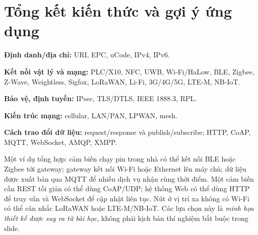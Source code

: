 \section{Tổng kết kiến thức và gợi ý ứng dụng}
\begin{ghinho}[title={Những khái niệm cần phân biệt}]
\textbf{Định danh/địa chỉ:} URI, EPC, uCode, IPv4, IPv6.\par
\textbf{Kết nối vật lý và mạng:} PLC/X10, NFC, UWB, Wi-Fi/HaLow, BLE, Zigbee, Z-Wave, Weightless, Sigfox, LoRaWAN, Li-Fi, 3G/4G/5G, LTE-M, NB-IoT.\par
\textbf{Bảo vệ, định tuyến:} IPsec, TLS/DTLS, IEEE 1888.3, RPL.\par
\textbf{Kiến trúc mạng:} cellular, LAN/PAN, LPWAN, mesh.\par
\textbf{Cách trao đổi dữ liệu:} request/response và publish/subscribe; HTTP, CoAP, MQTT, WebSocket, AMQP, XMPP.
\end{ghinho}

Một ví dụ tổng hợp: cảm biến chạy pin trong nhà có thể kết nối BLE hoặc Zigbee tới gateway; gateway kết nối Wi-Fi hoặc Ethernet lên máy chủ; dữ liệu được xuất bản qua MQTT để nhiều dịch vụ nhận cùng thời điểm. Một cảm biến cần REST tối giản có thể dùng CoAP/UDP; hệ thống Web có thể dùng HTTP để truy vấn và WebSocket để cập nhật liên tục. Nút ở vị trí xa không có Wi-Fi có thể cân nhắc LoRaWAN hoặc LTE-M/NB-IoT. Các lựa chọn này là \emph{minh họa thiết kế được suy ra từ bài học}, không phải kịch bản thí nghiệm bắt buộc trong slide.

